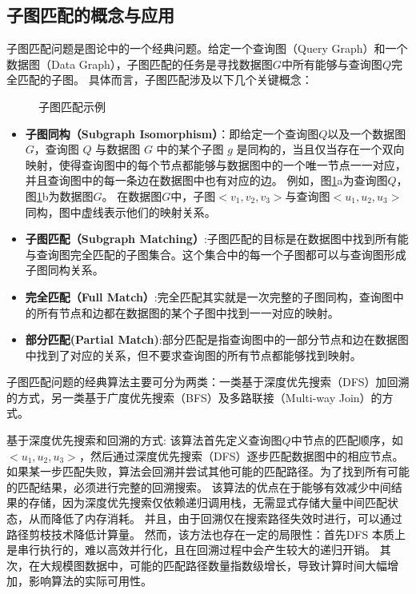 \subsection{子图匹配的概念与应用}
子图匹配问题是图论中的一个经典问题\cite{sm-ullmann-DBLP:journals/jacm/Ullmann76}。给定一个查询图（Query Graph）和一个数据图（Data Graph），子图匹配的任务是寻找数据图$G$中所有能够与查询图$Q$完全匹配的子图。
具体而言，子图匹配涉及以下几个关键概念：
\begin{figure}[h!]
    \centering
    \caption{子图匹配示例}
    \label{fig:example_subgraph_matching}
\end{figure}
\begin{itemize}
    \item \textbf{子图同构（Subgraph Isomorphism）}：即给定一个查询图$Q$以及一个数据图$G$，查询图 $Q$ 与数据图 $G$ 中的某个子图 $g$ 是同构的，当且仅当存在一个双向映射，使得查询图中的每个节点都能够与数据图中的一个唯一节点一一对应，并且查询图中的每一条边在数据图中也有对应的边。
    例如，图\ref{fig:example_subgraph_matching}a为查询图$Q$，图\ref{fig:example_subgraph_matching}b为数据图$G$。
    在数据图$G$中，子图$<v_1,v_2,v_3>$与查询图$<u_1,u_2,u_3>$同构，图中虚线表示他们的映射关系。
    \item \textbf{子图匹配（Subgraph Matching）}:子图匹配的目标是在数据图中找到所有能与查询图完全匹配的子图集合。这个集合中的每一个子图都可以与查询图形成子图同构关系。
    \item \textbf{完全匹配（Full Match）}:完全匹配其实就是一次完整的子图同构，查询图中的所有节点和边都在数据图的某个子图中找到一一对应的映射。
    \item \textbf{部分匹配(Partial Match)}:部分匹配是指查询图中的一部分节点和边在数据图中找到了对应的关系，但不要求查询图的所有节点都能够找到映射。
\end{itemize}


子图匹配问题的经典算法主要可分为两类：一类基于深度优先搜索（DFS）加回溯的方式\cite{sm-ullmann-DBLP:journals/jacm/Ullmann76}，另一类基于广度优先搜索（BFS）及多路联接（Multi-way Join）的方式\cite{sm-bfs-DBLP:conf/focs/AtseriasGM08}。

基于深度优先搜索和回溯的方式: 该算法首先定义查询图$Q$中节点的匹配顺序，如$<u_1, u_2, u_3>$，然后通过深度优先搜索（DFS）逐步匹配数据图中的相应节点。
如果某一步匹配失败，算法会回溯并尝试其他可能的匹配路径。为了找到所有可能的匹配结果，必须进行完整的回溯搜索。
该算法的优点在于能够有效减少中间结果的存储，因为深度优先搜索仅依赖递归调用栈，无需显式存储大量中间匹配状态，从而降低了内存消耗。
并且，由于回溯仅在搜索路径失效时进行，可以通过路径剪枝技术降低计算量。
然而，该方法也存在一定的局限性：首先DFS 本质上是串行执行的，难以高效并行化，且在回溯过程中会产生较大的递归开销。
其次，在大规模图数据中，可能的匹配路径数量指数级增长，导致计算时间大幅增加，影响算法的实际可用性。

